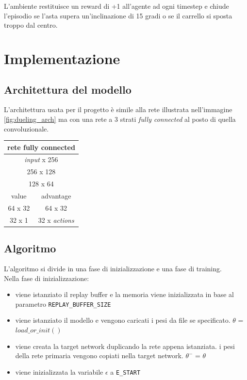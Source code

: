\documentclass{article}
\begin{document}
		L'ambiente restituisce un reward di +1 all'agente ad ogni timestep e chiude l'episodio se l'asta supera un'inclinazione di 15 gradi o se il carrello si sposta troppo dal centro.

	\section{Implementazione}
	\subsection{Architettura del modello}
		L'architettura usata per il progetto è simile alla rete illustrata nell'immagine \ref{fig:dueling_arch} ma con una rete a 3 strati \textit{fully connected} al posto di quella convoluzionale. \\

		\begin{center}
		\begin{tabular}{| c | c |}
			\hline
			\multicolumn{2}{|c|}{rete fully connected} \\
			\hline
			\multicolumn{2}{|c|}{\textit{input} x 256} \\
			\multicolumn{2}{|c|}{256 x 128} \\
			\multicolumn{2}{|c|}{128 x 64} \\
			\hline
			value & advantage \\
			\hline
			64 x 32 & 64 x 32 \\
			32 x 1 & 32 x \textit{actions} \\
			\hline
		\end{tabular}
		\end{center}

	\subsection{Algoritmo}
		L'algoritmo si divide in una fase di inizializzazione e una fase di training. \\
		Nella fase di inizializzazione:
		\begin{itemize}
		\item viene istanziato il replay buffer e la memoria viene inizializzata in base al parametro \texttt{REPLAY\_BUFFER\_SIZE}
		\item viene istanziato il modello e vengono caricati i pesi da file se specificato. $\theta$ = $load\_or\_init()$
		\item viene creata la target network duplicando la rete appena istanziata. i pesi della rete primaria vengono copiati nella target network. $\theta^{-}$ = $\theta$
		\item viene inizializzata la variabile $\epsilon$ a \texttt{E\_START}
		\end{itemize}
\end{document}
